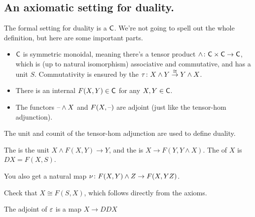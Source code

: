 \subsection*{An axiomatic setting for duality.}
The formal setting for duality is a  $\mathsf C$. We're not going to spell out
the whole definition, but here are some important parts.
\begin{itemize}
	\item $\mathsf C$ is symmetric monoidal, meaning there's a tensor product $\wedge\colon\mathsf C\times\mathsf C\to\mathsf C$, which is
	(up to natural isomorphism) associative and commutative, and has a unit $S$. Commutativity is ensured by the
	 $\tau\colon X\wedge Y\stackrel\cong\to Y\wedge X$.
	\item There is an internal  $F(X,Y)\in\mathsf C$ for any $X,Y\in\mathsf C$.
	\item The functors $\text{--}\wedge X$ and $F(X,\text{--})$ are adjoint (just like the tensor-hom adjunction).
\end{itemize}
The unit and counit of the tensor-hom adjunction are used to define duality.
\begin{defn}
The  is the unit $X\wedge F(X,Y)\to Y$, and the  is $X\to F(Y,Y\wedge
X)$. The  of $X$ is $DX = F(X,S)$.
\end{defn} %
You also get a natural map $\nu\colon F(X,Y)\wedge Z\to F(X,Y\smash Z)$.
\begin{ex}
Check that $X\cong F(S,X)$, which follows directly from the axioms.
\end{ex}
The adjoint of $\varepsilon$ is a map $X\to DDX$

